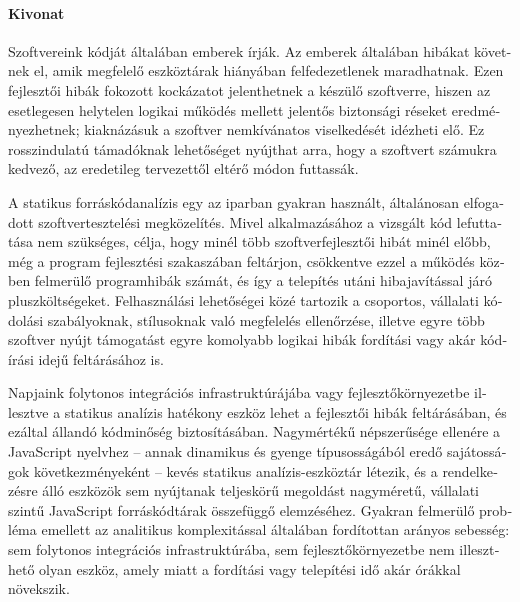 \begin{otherlanguage}{magyar}

  \paragraph*{Kivonat}
  \thispagestyle{plain}

  Szoftvereink kódját általában emberek írják. Az emberek általában hibákat követnek el, amik megfelelő eszköztárak hiányában felfedezetlenek maradhatnak. Ezen fejlesztői hibák fokozott kockázatot jelenthetnek a készülő szoftverre, hiszen az esetlegesen helytelen logikai működés mellett jelentős biztonsági réseket eredményezhetnek; kiaknázásuk a szoftver nemkívánatos viselkedését idézheti elő. Ez rosszindulatú támadóknak lehetőséget nyújthat arra, hogy a szoftvert számukra kedvező, az eredetileg tervezettől eltérő módon futtassák.

  A statikus forráskódanalízis egy az iparban gyakran használt, általánosan elfogadott szoftvertesztelési megközelítés. Mivel alkalmazásához a vizsgált kód lefuttatása nem szükséges, célja, hogy minél több szoftverfejlesztői hibát minél előbb, még a program fejlesztési szakaszában feltárjon, csökkentve ezzel a működés közben felmerülő programhibák számát, és így a telepítés utáni hibajavítással járó pluszköltségeket. Felhasználási lehetőségei közé tartozik a csoportos, vállalati kódolási szabályoknak, stílusoknak való megfelelés ellenőrzése, illetve egyre több szoftver nyújt támogatást egyre komolyabb logikai hibák fordítási vagy akár kódírási idejű feltárásához is.

  Napjaink folytonos integrációs infrastruktúrájába vagy fejlesztőkörnyezetbe illesztve a statikus analízis hatékony eszköz lehet a fejlesztői hibák feltárásában, és ezáltal állandó kódminőség biztosításában. Nagymértékű népszerűsége ellenére a JavaScript nyelvhez – annak dinamikus és gyenge típusosságából eredő sajátosságok következményeként – kevés statikus analízis-eszköztár létezik, és a rendelkezésre álló eszközök sem nyújtanak teljeskörű megoldást nagyméretű, vállalati szintű JavaScript forráskódtárak összefüggő elemzéséhez. Gyakran felmerülő probléma emellett az analitikus komplexitással általában fordítottan arányos sebesség: sem folytonos integrációs infrastruktúrába, sem fejlesztőkörnyezetbe nem illeszthető olyan eszköz, amely miatt a fordítási vagy telepítési idő akár órákkal növekszik.


\end{otherlanguage}
